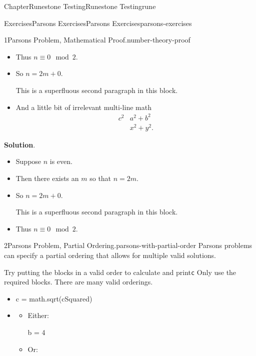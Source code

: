 \documentclass[oneside,10pt,]{book}
\newcommand{\blocktitlefont}{\relax}
\newcommand{\mono}[1]{\texttt{#1}}
\numberwithin{equation}{section}
\begin{document}
\begin{chapterptx}{Chapter}{Runestone Testing}{}{Runestone Testing}{}{}{rune}
\begin{exercises-section}{Exercises}{Parsons Exercises}{}{Parsons Exercises}{}{}{parsons-exercises}
\begin{divisionexercise}{1}{Parsons Problem, Mathematical Proof.}{}{number-theory-proof}
\begin{itemize}[label=\textbullet]
\begin{itemize}[label=]
\par
Then there exists an \(m\) so that \(n = 2m + 1\).%
\end{itemize}
%
\item{}Thus \(n\equiv 0\mod 2\).%
\item{}So \(n = 2m + 0\).%
\par
This is a superfluous second paragraph in this block.%
\item{}And a little bit of irrelevant multi-line math%
\begin{align*}
c^2&a^2+b^2\\
&x^2+y^2\text{.}
\end{align*}
%
\end{itemize}
%
\par\smallskip%
\noindent\textbf{\blocktitlefont Solution}.\hypertarget{number-theory-proof-4}{}\quad{}%
\begin{itemize}[label=\textbullet]
\item{}Suppose \(n\) is even.%
\item{}Then there exists an \(m\) so that \(n = 2m\).%
\item{}So \(n = 2m + 0\).%
\par
This is a superfluous second paragraph in this block.%
\item{}Thus \(n\equiv 0\mod 2\).%
\end{itemize}
%
\end{divisionexercise}%
\begin{divisionexercise}{2}{Parsons Problem, Partial Ordering.}{}{parsons-with-partial-order}%
Parsons problems can specify a partial ordering that allows for multiple valid solutions.%
\par
Try putting the blocks in a valid order to calculate and print\mono{c} Only use the required blocks. There are many valid orderings.%
\par
%
\begin{itemize}[label=\textbullet]
\item{}%
\begin{codedisplayleft}
c = math.sqrt(cSquared)
\end{codedisplayleft}
%
\item{}%
\begin{itemize}[label=]
\item{}Either:%
\par
%
\begin{codedisplay}
b = 4
\end{codedisplay}
%
\item{}Or:%
\par

\end{itemize}
\end{itemize}
\end{divisionexercise}
\end{exercises-section}
\end{chapterptx}
\end{document}

